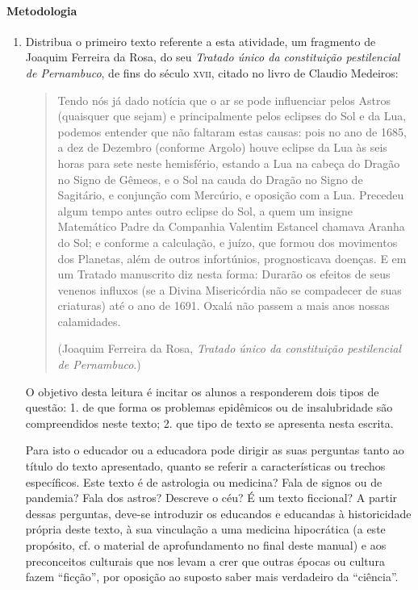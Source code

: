\documentclass[12pt]{extarticle}
\begin{document}
\paragraph{Metodologia}

\begin{enumerate}
\item Distribua o primeiro texto referente a esta atividade, um fragmento de
Joaquim Ferreira da Rosa, do seu \emph{Tratado único da constituição
pestilencial de Pernambuco}, de fins do século \textsc{xvii}, citado no livro
de Claudio Medeiros:

\begin{quote}
Tendo nós já dado notícia que o ar se pode influenciar pelos Astros
(quaisquer que sejam) e principalmente pelos eclipses do Sol e da Lua,
podemos entender que não faltaram estas causas: pois no ano de 1685, a
dez de Dezembro (conforme Argolo) houve eclipse da Lua às seis horas
para sete neste hemisfério, estando a Lua na cabeça do Dragão no Signo
de Gêmeos, e o Sol na cauda do Dragão no Signo de Sagitário, e conjunção
com Mercúrio, e oposição com a Lua. Precedeu algum tempo antes outro
eclipse do Sol, a quem um insigne Matemático Padre da Companhia Valentim
Estancel chamava Aranha do Sol; e conforme a calculação, e juízo, que
formou dos movimentos dos Planetas, além de outros infortúnios,
prognosticava doenças. E em um Tratado manuscrito diz nesta forma:
Durarão os efeitos de seus venenos influxos (se a Divina Misericórdia
não se compadecer de suas criaturas) até o ano de 1691. Oxalá não passem
a mais anos nossas calamidades.

(Joaquim Ferreira da Rosa, \emph{Tratado único da constituição
pestilencial de Pernambuco}.)
\end{quote}

O objetivo desta leitura é incitar os alunos a responderem dois tipos de
questão: 1. de que forma os problemas epidêmicos ou de insalubridade são
compreendidos neste texto; 2. que tipo de texto se apresenta nesta
escrita.

Para isto o educador ou a educadora pode dirigir as suas perguntas tanto
ao título do texto apresentado, quanto se referir a características ou
trechos específicos. Este texto é de astrologia ou medicina? Fala de
signos ou de pandemia? Fala dos astros? Descreve o céu? É um texto
ficcional? A partir dessas perguntas, deve-se introduzir os educandos e
educandas à historicidade própria deste texto, à sua vinculação a uma
medicina hipocrática (a este propósito, cf. o material de aprofundamento
no final deste manual) e aos preconceitos culturais que nos levam a crer
que outras épocas ou cultura fazem ``ficção'', por oposição ao suposto
saber mais verdadeiro da ``ciência''.


\end{enumerate}
\end{document}
